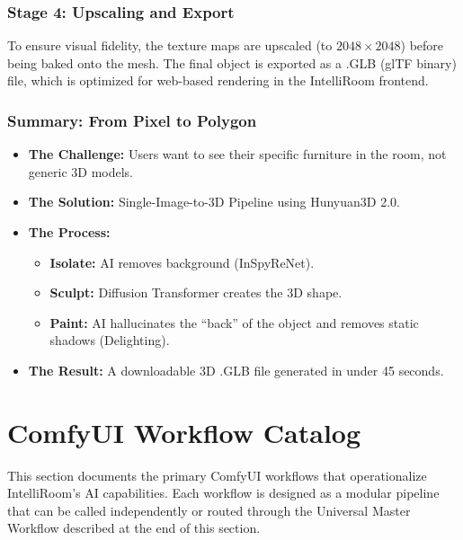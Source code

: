 \subsubsection*{Stage 4: Upscaling and Export}

To ensure visual fidelity, the texture maps are upscaled (to $2048 \times 2048$) before being baked onto the mesh. The final object is exported as a .GLB (glTF binary) file, which is optimized for web-based rendering in the IntelliRoom frontend.

\subsubsection*{Summary: From Pixel to Polygon}

\begin{itemize}
    \item \textbf{The Challenge:} Users want to see their specific furniture in the room, not generic 3D models.
    \item \textbf{The Solution:} Single-Image-to-3D Pipeline using Hunyuan3D 2.0.
    \item \textbf{The Process:}
    \begin{itemize}
        \item \textbf{Isolate:} AI removes background (InSpyReNet).
        \item \textbf{Sculpt:} Diffusion Transformer creates the 3D shape.
        \item \textbf{Paint:} AI hallucinates the ``back'' of the object and removes static shadows (Delighting).
    \end{itemize}
    \item \textbf{The Result:} A downloadable 3D .GLB file generated in under 45 seconds.
\end{itemize}

\section{ComfyUI Workflow Catalog}
\label{sec:comfyui_workflows}

This section documents the primary ComfyUI workflows that operationalize IntelliRoom's AI capabilities. Each workflow is designed as a modular pipeline that can be called independently or routed through the Universal Master Workflow described at the end of this section.

